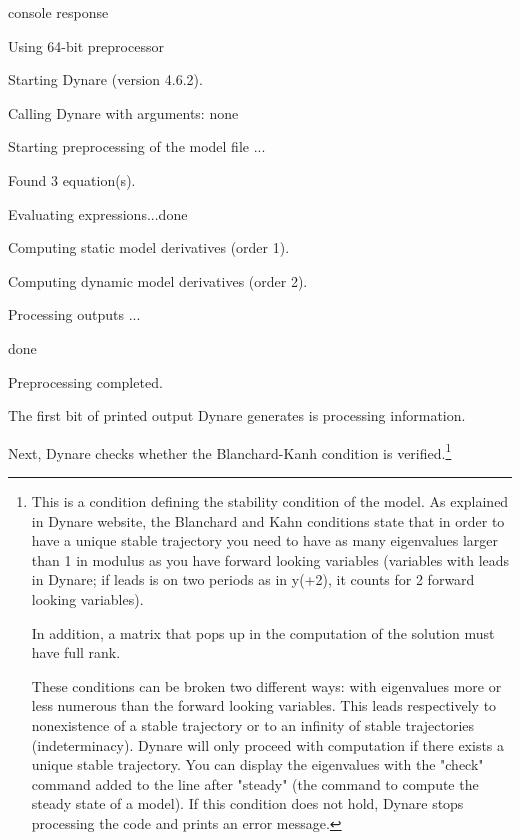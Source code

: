 \documentclass[a4paper,12pt]{article}%
\begin{document}
\vspace{3ex}
\begin{myresult}{console response}%


\textsf{Using 64-bit preprocessor}

\textsf{Starting Dynare (version 4.6.2).}

\textsf{Calling Dynare with arguments: none}

\textsf{Starting preprocessing of the model file ...}

\textsf{Found 3 equation(s).}

\textsf{Evaluating expressions...done}

\textsf{Computing static model derivatives (order 1).}

\textsf{Computing dynamic model derivatives (order 2).}

\textsf{Processing outputs ...}

\textsf{done}

\textsf{Preprocessing completed.}%

\end{myresult}
\vspace{3ex}%


The first bit of printed output Dynare generates is processing information.

Next, Dynare checks whether the Blanchard-Kanh condition is
verified.\footnote{This is a condition defining the stability condition of the
model. As explained in Dynare website, the Blanchard and Kahn conditions state
that in order to have a unique stable trajectory you need to have as many
eigenvalues larger than 1 in modulus as you have forward looking variables
(variables with leads in Dynare; if leads is on two periods as in y(+2), it
counts for 2 forward looking variables).
\par
In addition, a matrix that pops up in the computation of the solution must
have full rank.
\par
These conditions can be broken two different ways: with eigenvalues more or
less numerous than the forward looking variables. This leads respectively to
nonexistence of a stable trajectory or to an infinity of stable trajectories
(indeterminacy). Dynare will only proceed with computation if there exists a
unique stable trajectory. You can display the eigenvalues with the "check"
command added to the line after "steady" (the command to compute the steady
state of a model). If this condition does not hold, Dynare stops processing
the code and prints an error message.}%
\end{document}
